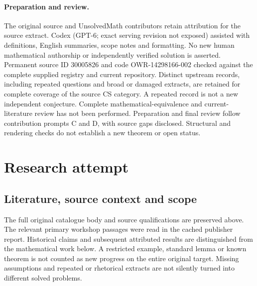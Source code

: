 \documentclass[11pt]{article}
\begin{document}
\paragraph{Preparation and review.}
The original source and UnsolvedMath contributors retain attribution for the source extract. Codex (GPT-6; exact serving revision not exposed) assisted with definitions, English summaries, scope notes and formatting. No new human mathematical authorship or independently verified solution is asserted. Permanent source ID 30005826 and code OWR-14298166-002 checked against the complete supplied registry and current repository. Distinct upstream records, including repeated questions and broad or damaged extracts, are retained for complete coverage of the source CS category. A repeated record is not a new independent conjecture. Complete mathematical-equivalence and current-literature review has not been performed. Preparation and final review follow contribution prompts C and D, with source gaps disclosed. Structural and rendering checks do not establish a new theorem or open status.
\label{end:30005826}

\section{Research attempt}
\subsection{Literature, source context and scope}
The full original catalogue body and source qualifications are preserved above. The relevant primary workshop passages were read in the cached publisher report. Historical claims and subsequent attributed results are distinguished from the mathematical work below. A restricted example, standard lemma or known theorem is not counted as new progress on the entire original target. Missing assumptions and repeated or rhetorical extracts are not silently turned into different solved problems.
\end{document}

